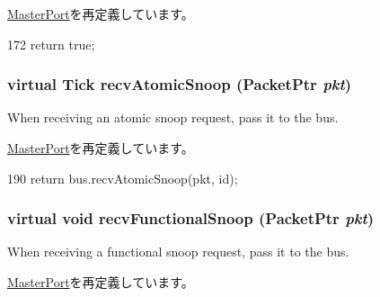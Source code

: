 \hyperlink{classMasterPort_a32602a6a3c3d66a639455036d6c08dd6}{MasterPort}を再定義しています。


\begin{DoxyCode}
172         { return true; }
\end{DoxyCode}
\hypertarget{classCoherentBus_1_1CoherentBusMasterPort_ae1160d8f94f042aba1dc9a07a72e1e82}{
\subsubsection[{recvAtomicSnoop}]{\setlength{\rightskip}{0pt plus 5cm}virtual {\bf Tick} recvAtomicSnoop ({\bf PacketPtr} {\em pkt})}}
\label{classCoherentBus_1_1CoherentBusMasterPort_ae1160d8f94f042aba1dc9a07a72e1e82}
When receiving an atomic snoop request, pass it to the bus. 

\hyperlink{classMasterPort_ae1160d8f94f042aba1dc9a07a72e1e82}{MasterPort}を再定義しています。


\begin{DoxyCode}
190         { return bus.recvAtomicSnoop(pkt, id); }
\end{DoxyCode}
\hypertarget{classCoherentBus_1_1CoherentBusMasterPort_af5b15bc08781cf0ba6190efc37d5b67e}{
\subsubsection[{recvFunctionalSnoop}]{\setlength{\rightskip}{0pt plus 5cm}virtual void recvFunctionalSnoop ({\bf PacketPtr} {\em pkt})}}
\label{classCoherentBus_1_1CoherentBusMasterPort_af5b15bc08781cf0ba6190efc37d5b67e}
When receiving a functional snoop request, pass it to the bus. 

\hyperlink{classMasterPort_af5b15bc08781cf0ba6190efc37d5b67e}{MasterPort}を再定義しています。


